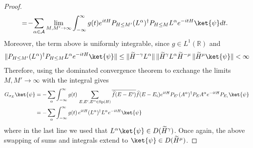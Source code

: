\documentclass[11pt]{amsart}
\newcommand{\1}{\mathbbm{1}}
\theoremstyle{plain}
\theoremstyle{definition}
\theoremstyle{remark}
\numberwithin{equation}{section}
\begin{document}
\begin{proof}
\begin{align*}
&\,=\!-\!\sum_{\alpha\in\mathcal{A}}\lim_{M,M'\to\infty}\int_{-\infty}^\infty \!\,g(t)e^{itH}P_{H\le M'}(L^\alpha)^\dagger P_{H\le M}L^\alpha e^{-itH}\ket{\psi}dt.
\end{align*}
Moreover, the term above is uniformly integrable, since $g\in L^1(\mathbb{R})$ and 
\begin{align*}
\|P_{H\le M'}(L^\alpha)^\dagger P_{H\le M} L^\alpha e^{-itH}\ket{\psi}\|\le  \|\widetilde{H}^{-\gamma}L^\alpha\|\,\|\widetilde{H}^\gamma L^\alpha \widetilde{H}^{-\mu} \,\|\widetilde{H}^\mu\ket{\psi}\|<\infty
\end{align*}
Therefore, using the dominated convergence theorem to exchange the limits $M,M'\to \infty$ with the integral gives
 \begin{align*}
G_{\sigma_E}\ket{\psi}&=-\sum_{\alpha}\int_{-\infty}^{\infty}g(t)\,\sum_{E,E',E''\in\operatorname{Sp}(H)}\overline{\widehat{f}(E-E')}\widehat{f}(E-E_i)e^{itH}P_{E'}(A^\alpha)^\dagger P_E A^\alpha e^{-itH}P_{E_i}\ket{\psi}\\
&=-\sum_{\alpha}\int_{-\infty}^{\infty}g(t)\,e^{itH}(L^\alpha)^\dagger  L^\alpha e^{-itH}\ket{\psi}
\end{align*}
where in the last line we used that $L^\alpha\ket{\psi}\in D(\widetilde{H}^{\gamma})$. 
Once again, the above swapping of sums and integrals extend to $\ket{\psi}\in D(\widetilde{H}^{\mu})$.


\end{proof}
\end{document}
